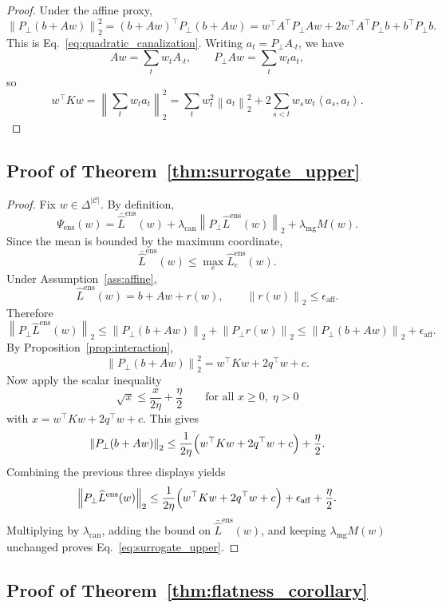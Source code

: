 \documentclass{article}
\theoremstyle{definition}
\newcommand{\cC}{\mathcal{C}}
\newcommand{\simplex}{\Delta}
\newcommand{\norm}[1]{\left\lVert #1 \right\rVert}
\newcommand{\inner}[2]{\left\langle #1, #2 \right\rangle}
\begin{document}
\begin{proof}
Under the affine proxy,
\[
\norm{P_\perp(b+Aw)}_2^2
=
(b+Aw)^\top P_\perp (b+Aw)
=
w^\top A^\top P_\perp A w + 2 w^\top A^\top P_\perp b + b^\top P_\perp b.
\]
This is Eq.~\eqref{eq:quadratic_canalization}. Writing \(a_t=P_\perp A_{\cdot t}\), we have
\[
Aw = \sum_t w_t A_{\cdot t},
\qquad
P_\perp Aw = \sum_t w_t a_t,
\]
so
\[
w^\top K w
=
\norm{\sum_t w_t a_t}_2^2
=
\sum_t w_t^2 \norm{a_t}_2^2
+ 2\sum_{s<t} w_s w_t \inner{a_s}{a_t}.
\]
\end{proof}

\subsection{Proof of Theorem~\ref{thm:surrogate_upper}}

\begin{proof}
Fix \(w\in\simplex^{|\cC|}\). By definition,
\[
\Psi_{\mathrm{ens}}(w)
=
\bar{\widehat L}^{\mathrm{ens}}(w)
+
\lambda_{\mathrm{can}}\norm{P_\perp \widehat L^{\mathrm{ens}}(w)}_2
+
\lambda_{\mathrm{mg}} M(w).
\]
Since the mean is bounded by the maximum coordinate,
\[
\bar{\widehat L}^{\mathrm{ens}}(w)
\le
\max_e \widehat L_e^{\mathrm{ens}}(w).
\]
Under Assumption~\ref{ass:affine},
\[
\widehat L^{\mathrm{ens}}(w)=b+Aw+r(w),
\qquad
\norm{r(w)}_2\le \epsilon_{\mathrm{aff}}.
\]
Therefore
\[
\norm{P_\perp \widehat L^{\mathrm{ens}}(w)}_2
\le
\norm{P_\perp(b+Aw)}_2 + \norm{P_\perp r(w)}_2
\le
\norm{P_\perp(b+Aw)}_2 + \epsilon_{\mathrm{aff}}.
\]
By Proposition~\ref{prop:interaction},
\[
\norm{P_\perp(b+Aw)}_2^2
=
w^\top K w + 2 q^\top w + c.
\]
Now apply the scalar inequality
\[
\sqrt{x}\le \frac{x}{2\eta}+\frac{\eta}{2}
\qquad
\text{for all } x\ge 0,\; \eta>0
\]
with \(x=w^\top K w + 2 q^\top w + c\). This gives
\[
\norm{P_\perp(b+Aw)}_2
\le
\frac{1}{2\eta}\Bigl(w^\top K w + 2 q^\top w + c\Bigr)+\frac{\eta}{2}.
\]
Combining the previous three displays yields
\[
\norm{P_\perp \widehat L^{\mathrm{ens}}(w)}_2
\le
\frac{1}{2\eta}\Bigl(w^\top K w + 2 q^\top w + c\Bigr)
+
\epsilon_{\mathrm{aff}}
+
\frac{\eta}{2}.
\]
Multiplying by \(\lambda_{\mathrm{can}}\), adding the bound on \(\bar{\widehat L}^{\mathrm{ens}}(w)\), and keeping \(\lambda_{\mathrm{mg}}M(w)\) unchanged proves Eq.~\eqref{eq:surrogate_upper}.
\end{proof}

\subsection{Proof of Theorem~\ref{thm:flatness_corollary}}
\end{document}
